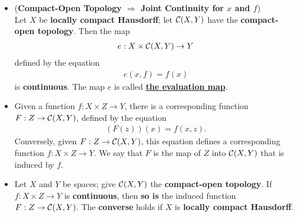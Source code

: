 \documentclass[11pt]{article}
\begin{document}
\begin{itemize}
\item \begin{theorem} (\textbf{Compact-Open Topology $\Rightarrow$ Joint Continuity for $x$ and $f$})\\
Let $X$ be \textbf{locally compact Hausdorff}; let ${\mathcal C}(X, Y)$ have the \textbf{compact-open topology}. Then the map
\begin{align*}
e: X \times {\mathcal C}(X, Y) \rightarrow Y
\end{align*}
defined by the equation
\begin{align*}
e(x, f) = f(x)
\end{align*}
is \textbf{continuous}. The map $e$ is called \underline{\textbf{the evaluation map}}.
\end{theorem}

\item \begin{definition}
Given a function $f : X \times Z \rightarrow Y$, there is a corresponding function $F : Z \rightarrow {\mathcal C}(X, Y)$, defined by the equation
\begin{align*}
(F(z))(x) = f(x, z).
\end{align*}
Conversely, given $F : Z \rightarrow {\mathcal C}(X, Y)$, this equation defines a corresponding function
$f : X \times Z \rightarrow Y$. We say that $F$ is the map of $Z$ into ${\mathcal C}(X, Y)$ that is induced by $f$.
\end{definition}

\item \begin{proposition}
Let $X$ and $Y$ be spaces; give ${\mathcal C}(X, Y)$ the \textbf{compact-open topology}. If $f: X \times Z \rightarrow Y$ is \textbf{continuous}, then \textbf{so is} the induced function $F : Z \rightarrow {\mathcal C}(X, Y)$. The \textbf{converse} holds if $X$ is \textbf{locally compact Hausdorff}.
\end{proposition}
\end{itemize}
\end{document}

